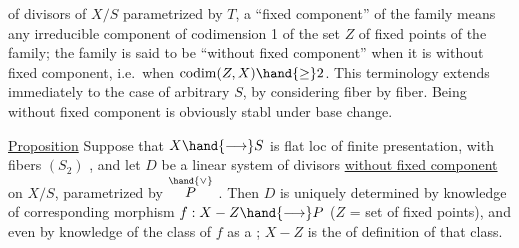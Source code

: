 
of divisors of $X/S$ parametrized by $T$, a ``fixed component'' of the
family means any irreducible component of codimension 1 of the set $Z$ of 
fixed points of the family; the family is said to be ``without fixed
component'' when it is without fixed component, i.e.\ when $\operatorname{codim}(Z,X) \hand{\geq} 2$. This
terminology extends immediately to the case of arbitrary $S$, by considering
fiber by fiber. Being without fixed component is obviously stabl
under base change.

\uline{Proposition} \hand{/}Suppose that $X \hand{\longrightarrow} S$ is flat loc of finite presentation, with fibers
$(S_2)$ , and let $D$ be a linear system of divisors \uline{without fixed component}
on $X/S$, parametrized by $\overset{\hand{\vee}}{P}$ . Then $D$ is uniquely determined by
knowledge of  corresponding morphism $f: X - Z \hand{\longrightarrow} P$ ($Z$ = set
of fixed points), and even by knowledge of the class of $f$ as a
  ; $X-Z$ is the 
of definition of that class.

